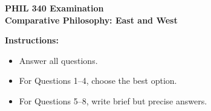 \documentclass[11pt]{article}
\begin{document}
\begin{center}
  {\Large \textbf{PHIL 340 Examination}}\\[0.25em]
  {\large \textbf{Comparative Philosophy: East and West}}\\[0.5em]
\end{center}

\noindent\textbf{Instructions:}
\begin{itemize}
  \item Answer all questions.
  \item For Questions 1--4, choose the best option.
  \item For Questions 5--8, write brief but precise answers.
\end{itemize}

\vspace{0.5em}
\end{document}
